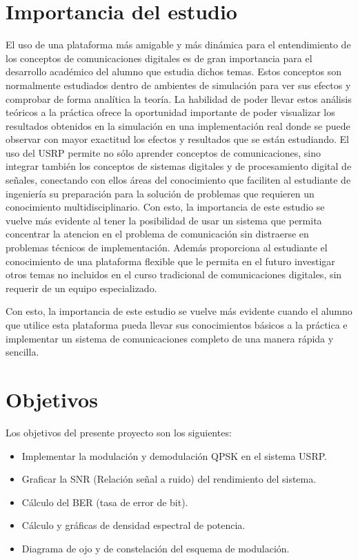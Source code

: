 \section{Importancia del estudio}

El uso de una plataforma m\'as amigable y m\'as din\'amica para el entendimiento de los conceptos de comunicaciones
digitales es de gran importancia para el desarrollo acad\'emico del alumno que estudia dichos temas. Estos conceptos son
normalmente estudiados dentro de ambientes de simulaci\'on para ver sus efectos y comprobar de forma anal\'itica la
teor\'ia. La habilidad de poder llevar estos an\'alisis te\'oricos a la pr\'actica ofrece la oportunidad importante de
poder visualizar los resultados obtenidos en la simulaci\'on en una implementaci\'on real donde se puede observar con mayor
exactitud los efectos y resultados que se est\'an estudiando. El uso del USRP permite no s\'olo aprender conceptos de
comunicaciones, sino integrar tambi\'en los conceptos de sistemas digitales y de procesamiento digital de se\~nales,
conectando con ellos \'areas del conocimiento que faciliten al estudiante de ingenier\'ia su preparaci\'on para la
soluci\'on de problemas que requieren un conocimiento multidisciplinario. Con esto, la importancia de este estudio se vuelve
m\'as evidente al tener la posibilidad de usar un sistema que permita concentrar la atencion en el problema de
comunicaci\'on sin distraerse en problemas t\'ecnicos de implementaci\'on. Adem\'as proporciona al estudiante el
conocimiento de una plataforma flexible que le permita en el futuro investigar otros temas no incluidos en el curso
tradicional de comunicaciones digitales, sin requerir de un equipo especializado.


Con esto, la importancia de este estudio se vuelve
m\'as evidente cuando el alumno que utilice esta plataforma pueda llevar sus conocimientos b\'asicos a la pr\'actica e implementar un sistema de comunicaciones completo de una manera r\'apida y
sencilla.

\section{Objetivos}

Los objetivos del presente proyecto son los siguientes:
\begin{itemize}
  \item Implementar la modulaci\'on y demodulaci\'on QPSK en el sistema USRP.
  \item Graficar la SNR (Relaci\'on se\~nal a ruido) del rendimiento del sistema.
  \item C\'alculo del BER (tasa de error de bit).
  \item C\'alculo y gr\'aficas de densidad espectral de potencia.
  \item Diagrama de ojo y de constelaci\'on del esquema de modulaci\'on.
\end{itemize}

